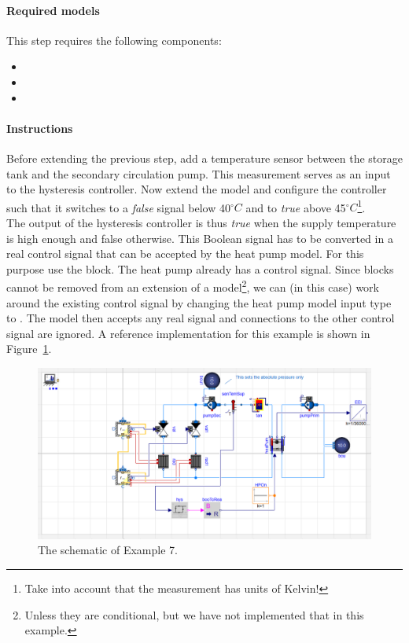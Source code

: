 \documentclass[10pt,a4paper]{article}
\begin{document}
\paragraph{Required models}
This step requires the following components:
\begin{itemize}
\item {}
\item {}
\item {}
\end{itemize}

\paragraph{Instructions}
Before extending the previous step, add a temperature sensor between the storage tank
and the secondary circulation pump.
This measurement serves as an input to the hysteresis controller.
Now extend the model and configure the controller such that it switches to a \textit{false} signal below
40$^{\circ}C$ and to \textit{true} above 45$^{\circ}C$\footnote{Take into account that the measurement has units of Kelvin!}.\\

The output of the hysteresis controller is thus \textit{true} when the supply temperature is 
high enough and false otherwise.
This Boolean signal has to be converted in a real control signal that can be
accepted by the heat pump model.
For this purpose use the  block.
The heat pump already has a control signal. 
Since blocks cannot be removed from an extension of a model\footnote{Unless 
they are conditional, but we have not implemented that in this example.},
we can (in this case) work around the existing control signal
by changing the heat pump model input type to .
The model then accepts any real signal and connections to the other control 
signal are ignored. A reference implementation for this example is shown in Figure~\ref{fig:scheHVAC}.

\begin{figure}[h!]
	\centering
	\includegraphics[width=\linewidth]{Schematic7.png}
	\caption{The schematic of Example 7.}
	\label{fig:scheHVAC}
\end{figure}
\end{document}
